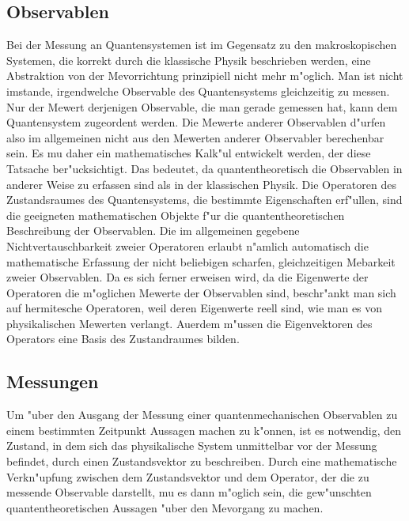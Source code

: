    \subsection{Observablen}
      Bei der Messung an Quantensystemen ist im Gegensatz zu den makroskopischen Systemen, die korrekt durch die klassische Physik beschrieben werden, eine
      Abstraktion von der Me\3vorrichtung prinzipiell nicht mehr m"oglich. Man ist nicht
      imstande, irgendwelche Observable des Quantensystems gleichzeitig zu messen. Nur der Me\3wert derjenigen Observable, die man gerade gemessen hat, kann
      dem Quantensystem zugeordent werden. Die Me\3werte anderer Observablen d"urfen also im allgemeinen nicht aus den Me\3werten anderer Observabler berechenbar 
      sein. Es mu\3 daher ein mathematisches Kalk"ul entwickelt werden, der diese Tatsache ber"ucksichtigt. Das bedeutet, da\3 quantentheoretisch die Observablen in
      anderer Weise zu erfassen sind als in der klassischen Physik. Die Operatoren des Zustandsraumes \raum{} des Quantensystems, die bestimmte Eigenschaften erf"ullen, sind die 
      geeigneten mathematischen Objekte f"ur die quantentheoretischen Beschreibung der Observablen.
      Die im allgemeinen gegebene Nichtvertauschbarkeit zweier Operatoren erlaubt n"amlich automatisch die mathematische Erfassung der nicht beliebigen scharfen, gleichzeitigen 
      Me\3barkeit zweier Observablen. Da es sich ferner erweisen wird, da\3 die Eigenwerte der Operatoren die m"oglichen Me\3werte der Observablen sind, beschr"ankt
      man sich auf hermitesche Operatoren, weil deren Eigenwerte reell sind, wie man es von physikalischen Me\3werten  verlangt. Au\3erdem m"ussen die Eigenvektoren des 
      Operators eine Basis des Zustandraumes \raum{} bilden. 
   \subsection{Messungen}
      Um "uber den Ausgang der Messung einer quantenmechanischen Observablen zu einem bestimmten Zeitpunkt Aussagen machen zu k"onnen, ist es notwendig, den
      Zustand, in dem sich das physikalische System unmittelbar vor der Messung befindet, durch einen Zustandsvektor zu beschreiben. Durch eine mathematische
      Verkn"upfung zwischen dem Zustandsvektor und dem Operator, der die zu messende Observable darstellt, mu\3 es dann m"oglich sein, die gew"unschten 
      quantentheoretischen Aussagen "uber den Me\3vorgang zu machen. 
